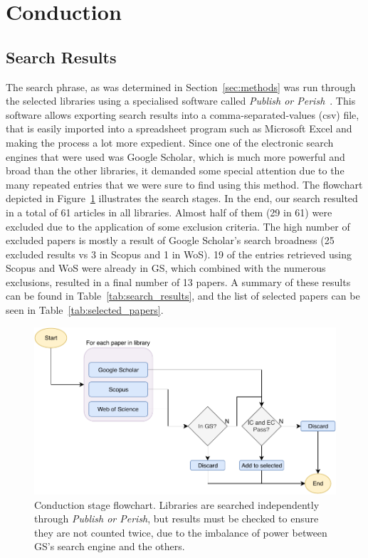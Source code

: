 \section{Conduction}
\label{sec:conduction}
\subsection{Search Results}
\label{sub:the_search}

The search phrase, as was determined in Section~\ref{sec:methods} was
run through the selected libraries using a specialised software called
\emph{Publish or Perish}~\cite{Harzing}. This software allows exporting
search results into a comma-separated-values (csv) file, that is easily
imported into a spreadsheet program such as Microsoft Excel and making
the process a lot more expedient. Since one of the electronic search
engines that were used was Google Scholar, which is much more powerful
and broad than the other libraries, it demanded some special attention
due to the many repeated entries that we were sure to find using this
method. The flowchart depicted in Figure~\ref{fig:flowchart} illustrates
the search stages. In the end, our search resulted in a total of 61
articles in all libraries. Almost half of them (29 in 61) were excluded
due to the application of some exclusion criteria. The high number of
excluded papers is mostly a result of Google Scholar's search broadness
(25 excluded results vs 3 in Scopus and 1 in WoS). 19 of the entries
retrieved using Scopus and WoS were already in GS, which combined with
the numerous exclusions, resulted in a final number of 13 papers. A
summary of these results can be found in Table~\ref{tab:search_results},
and the list of selected papers can be seen in
Table~\ref{tab:selected_papers}.

\begin{figure}[htpb]
    \centering
    \includegraphics[width=\linewidth]{img/pdf/asd_flowchart.pdf}
    \caption{Conduction stage flowchart. Libraries are searched
    independently through \emph{Publish or Perish}, but results must be
    checked to ensure they are not counted twice, due to the imbalance of
    power between GS's search engine and the others.}
    \label{fig:flowchart}
\end{figure}

